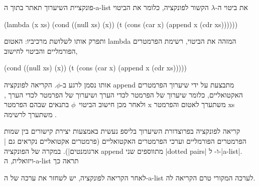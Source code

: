 פונקציית השיערוך תאתר בתוך ה-a-list את ביטוי ה-$λ$ הקשור לפונקציה, כלומר
את הביטוי
\begin{LISP}
(lambda
  (x xs)
  (cond ((null xs) (x))
        (t (cons
              (car x)
              (append x (cdr xs))))))
\end{LISP}
ותפרק אותו לשלושת
מרכיביו: האטום lambda המזהה את הביטוי, רשימת הפרמטרים הפורמליים 
והביטוי לחישוב,
\begin{LISP}
(cond ((null xs) (x))
      (t (cons
            (car x)
            (append x (cdr xs)))))
\end{LISP}
אותו נסמן לרגע ב-$ϕ$. הקריאה לפונקציה append מתבצעת על ידי שיערוך הפרמטרים
האקטואליים, כלומר שיערוך של הפרמטר  לכדי הערך  ושיערוך של
הפרמטר  לכדי הערך , ולאחר מכן חישוב הביטוי~$ϕ$ בתנאים
שבהם הפרמטר x משתערך לאטום  והפרמטר xs משתערך לרשימה .

קריאה לפונקציה בפרוצדורת השיערוך בליספ נעשית באמצעות יצירת קישורים בין שמות
הפרמטרים הפורמליים וערכי הפרמטרים האקטואליים (פרמטרים אקטואליים נקראים גם
\ע|ארגומנטים|). במקרה של הפונקציה append מתווספים שני \E|dotted pairs|
 ו- ל-\E|a-list|.
ויזואלית, ה-a-list תראה כך
\begin{LTR}
\end{LTR}
לאחר הקריאה לפונקציה, יש לשחזר את ערכה של ה-a-list לערכה המקורי טרם הקריאה לה.


